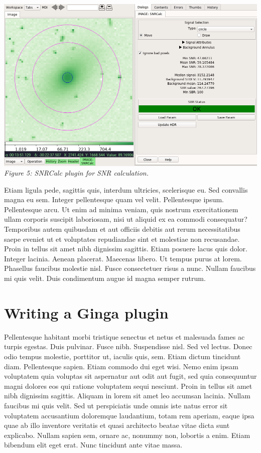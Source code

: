 \documentclass[]{article}
\begin{document}
\begin{multicols}{3}
\para
\begin{center}
\includegraphics[width=8in]{plugin_snrcalc} \\
\vspace*{0.4em}
\label{fig:plugin_snrcalc}
{\small\em Figure 5: SNRCalc plugin for SNR calculation.}
\end{center}

\para
Etiam ligula pede, sagittis quis, interdum ultricies, scelerisque
eu. Sed convallis magna eu sem. Integer pellentesque quam vel
velit. Pellentesque ipsum. Pellentesque arcu. Ut enim ad minima veniam,
quis nostrum exercitationem ullam corporis suscipit laboriosam, nisi ut
aliquid ex ea commodi consequatur? Temporibus autem quibusdam et aut
officiis debitis aut rerum necessitatibus saepe eveniet ut et voluptates
repudiandae sint et molestiae non recusandae. Proin in tellus sit amet
nibh dignissim sagittis. Etiam posuere lacus quis dolor. Integer
lacinia. Aenean placerat. Maecenas libero. Ut tempus purus at
lorem. Phasellus faucibus molestie nisl. Fusce consectetuer risus a
nunc. Nullam faucibus mi quis velit. Duis condimentum augue id magna
semper rutrum.

\section*{Writing a Ginga plugin}

\para
Pellentesque habitant morbi tristique senectus et netus et malesuada
fames ac turpis egestas. Duis pulvinar. Fusce nibh. Suspendisse
nisl. Sed vel lectus. Donec odio tempus molestie, porttitor ut, iaculis
quis, sem. Etiam dictum tincidunt diam. Pellentesque sapien. Etiam
commodo dui eget wisi. Nemo enim ipsam voluptatem quia voluptas sit
aspernatur aut odit aut fugit, sed quia consequuntur magni dolores eos
qui ratione voluptatem sequi nesciunt. Proin in tellus sit amet nibh
dignissim sagittis. Aliquam in lorem sit amet leo accumsan
lacinia. Nullam faucibus mi quis velit. Sed ut perspiciatis unde omnis
iste natus error sit voluptatem accusantium doloremque laudantium, totam
rem aperiam, eaque ipsa quae ab illo inventore veritatis et quasi
architecto beatae vitae dicta sunt explicabo. Nullam sapien sem, ornare
ac, nonummy non, lobortis a enim. Etiam bibendum elit eget erat. Nunc
tincidunt ante vitae massa.


\end{multicols}
\end{document}
